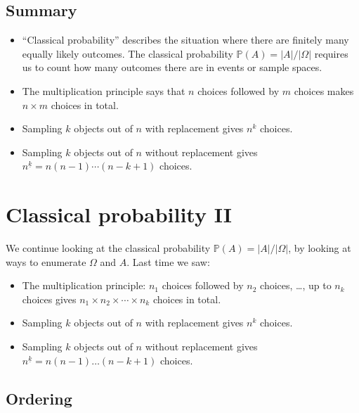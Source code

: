 \documentclass[
  letterpaper,
  DIV=11,
  numbers=noendperiod]{scrreprt}
\providecommand{\tightlist}{%
  \setlength{\itemsep}{0pt}\setlength{\parskip}{0pt}}\usepackage{longtable,booktabs,array}
\theoremstyle{remark}
\begin{document}
\hypertarget{summary-L05}{%
\section*{Summary}\label{summary-L05}}


\begin{itemize}
\tightlist
\item
  ``Classical probability'' describes the situation where there are
  finitely many equally likely outcomes. The classical probability
  \(\mathbb P(A) = |A|/|\Omega|\) requires us to count how many outcomes
  there are in events or sample spaces.
\item
  The multiplication principle says that \(n\) choices followed by \(m\)
  choices makes \(n \times m\) choices in total.
\item
  Sampling \(k\) objects out of \(n\) with replacement gives \(n^k\)
  choices.
\item
  Sampling \(k\) objects out of \(n\) without replacement gives
  \(n^{\underline{k}} = n(n-1)\cdots(n-k+1)\) choices.
\end{itemize}

\hypertarget{L06-classical-ii}{%
\chapter{Classical probability II}\label{L06-classical-ii}}

We continue looking at the classical probability
\(\mathbb P(A) = |A|/|\Omega|\), by looking at ways to enumerate
\(\Omega\) and \(A\). Last time we saw:

\begin{itemize}
\tightlist
\item
  The multiplication principle: \(n_1\) choices followed by \(n_2\)
  choices, \ldots, up to \(n_k\) choices gives
  \(n_1 \times n_2 \times \cdots \times n_k\) choices in total.
\item
  Sampling \(k\) objects out of \(n\) with replacement gives \(n^k\)
  choices.
\item
  Sampling \(k\) objects out of \(n\) without replacement gives
  \(n^{\underline{k}} = n(n-1)\dots(n-k+1)\) choices.
\end{itemize}

\hypertarget{ordering}{%
\section{Ordering}\label{ordering}}
\end{document}
